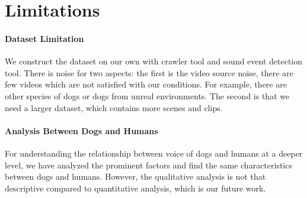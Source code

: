 \section* {Limitations}
\paragraph{Dataset Limitation}
We construct the dataset on our own with crawler tool and sound event detection tool. There is noise for two aspects: the first is the video source noise, there are few videos which are not satisfied with our conditions. For example, there are other species of dogs or dogs from unreal environments. The second is that we need a larger dataset, which contains more scenes and clips.


\paragraph{Analysis Between Dogs and Humans}
For understanding the relationship between voice of dogs and humans at a deeper level, we have analyzed the prominent factors and find the same characteristics between dogs and humans. However, the qualitative analysis is not that descriptive compared to quantitative analysis, which is our future work.

